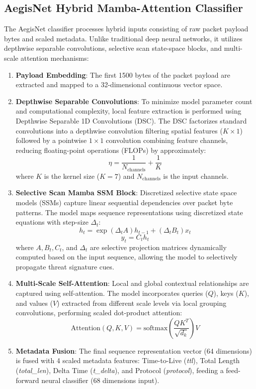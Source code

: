 \documentclass[journal,twoside]{IEEEtran}
\begin{document}
\subsection{AegisNet Hybrid Mamba-Attention Classifier}
The AegisNet classifier processes hybrid inputs consisting of raw packet payload bytes and scaled metadata. Unlike traditional deep neural networks, it utilizes depthwise separable convolutions, selective scan state-space blocks, and multi-scale attention mechanisms:
\begin{enumerate}
    \item \textbf{Payload Embedding}: The first 1500 bytes of the packet payload are extracted and mapped to a 32-dimensional continuous vector space.
    \item \textbf{Depthwise Separable Convolutions}: To minimize model parameter count and computational complexity, local feature extraction is performed using Depthwise Separable 1D Convolutions (DSC). The DSC factorizes standard convolutions into a depthwise convolution filtering spatial features ($K \times 1$) followed by a pointwise $1 \times 1$ convolution combining feature channels, reducing floating-point operations (FLOPs) by approximately:
    \begin{equation}
    \eta = \frac{1}{N_{\text{channels}}} + \frac{1}{K}
    \end{equation}
    where $K$ is the kernel size ($K=7$) and $N_{\text{channels}}$ is the input channels.
    \item \textbf{Selective Scan Mamba SSM Block}: Discretized selective state space models (SSMs) capture linear sequential dependencies over packet byte patterns. The model maps sequence representations using discretized state equations with step-size $\Delta_t$:
    \begin{equation}
    h_t = \exp(\Delta_t A) h_{t-1} + (\Delta_t B_t) x_t
    \end{equation}
    \begin{equation}
    y_t = C_t h_t
    \end{equation}
    where $A, B_t, C_t$, and $\Delta_t$ are selective projection matrices dynamically computed based on the input sequence, allowing the model to selectively propagate threat signature cues.
    \item \textbf{Multi-Scale Self-Attention}: Local and global contextual relationships are captured using self-attention. The model incorporates queries ($Q$), keys ($K$), and values ($V$) extracted from different scale levels via local grouping convolutions, performing scaled dot-product attention:
    \begin{equation}
    \text{Attention}(Q, K, V) = \text{softmax}\left(\frac{Q K^T}{\sqrt{d_k}}\right) V
    \end{equation}
    \item \textbf{Metadata Fusion}: The final sequence representation vector (64 dimensions) is fused with 4 scaled metadata features: Time-to-Live (\textit{ttl}), Total Length (\textit{total\_len}), Delta Time (\textit{t\_delta}), and Protocol (\textit{protocol}), feeding a feed-forward neural classifier (68 dimensions input).
\end{enumerate}
\end{document}
